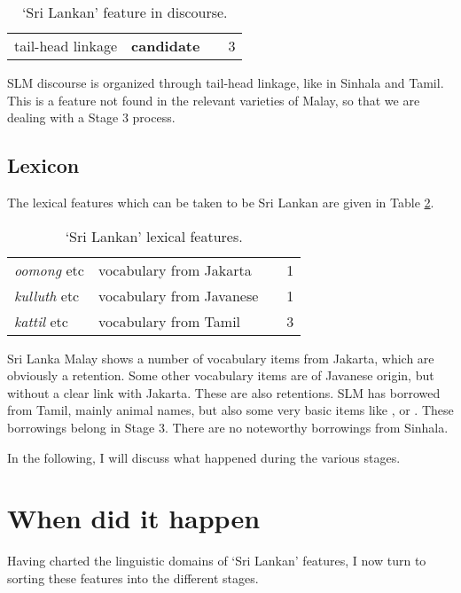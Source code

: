 \begin{table}[h!]
\centering
\begin{tabular}{p{4cm}p{4cm}p{2cm}l}
tail-head linkage & \textbf{candidate} & \tiny \citet[474-475]{Nordhoff2009} &    3\\
\end{tabular}
\caption{`Sri Lankan' feature in discourse.}
\label{tab:discourse}
\end{table}

SLM discourse is organized through tail-head linkage, like in Sinhala and Tamil. This is a feature not found in the relevant varieties of Malay, so that we are dealing with a Stage 3 process.


\subsection{Lexicon}
The lexical features which can be taken to be Sri Lankan are given in Table \ref{tab:lexicon}.

\begin{table}[h!]
\centering
\begin{tabular}{p{4cm}p{4cm}p{2cm}l}
\emph{oomong} etc & vocabulary from Jakarta &   &  1 \\
\emph{kulluth} etc & vocabulary from Javanese &   &  1 \\
\hline
\emph{kattil} etc & vocabulary from Tamil & & 3\\
\end{tabular}
\caption{`Sri Lankan' lexical features.}
\label{tab:lexicon}
\end{table}

Sri Lanka Malay shows a number of vocabulary items from Jakarta, which are obviously a retention. Some other vocabulary items are of Javanese origin, but without a clear link with Jakarta. These are also retentions. SLM has borrowed from Tamil, mainly animal names, but also some very basic items like ,  or . These borrowings belong in Stage 3. There are  no noteworthy borrowings from  Sinhala.

In the following, I will discuss what happened during the various stages.

\section{When did it happen}
Having charted the linguistic domains of `Sri Lankan' features, I now turn to sorting these features into the different stages. 

